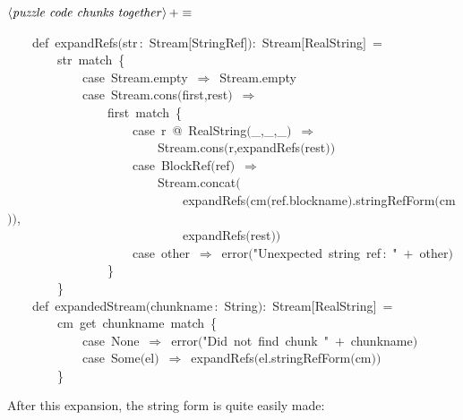 \documentclass[a4paper,12pt]{article}
\begin{document}
$\left<\mbox{\emph{puzzle code chunks together}}\right>+\equiv$
\begin{program}~~~~{\vem def}~expandRefs$($str\,{\rm :}~Stream$[$StringRef$]$$)${\rm :}~Stream$[$RealString$]$~=
\\~~~~~~~~str~{\vem match}~{\small\{}
\\~~~~~~~~~~~~{\vem case}~Stream.empty~$\Rightarrow$~Stream.empty
\\~~~~~~~~~~~~{\vem case}~Stream.cons$($first,rest$)$~$\Rightarrow$
\\~~~~~~~~~~~~~~~~first~{\vem match}~{\small\{}
\\~~~~~~~~~~~~~~~~~~~~{\vem case}~r~@~RealString$($\_,\_,\_$)$~$\Rightarrow$
\\~~~~~~~~~~~~~~~~~~~~~~~~Stream.cons$($r,expandRefs$($rest$)$$)$
\\~~~~~~~~~~~~~~~~~~~~{\vem case}~BlockRef$($ref$)$~$\Rightarrow$
\\~~~~~~~~~~~~~~~~~~~~~~~~Stream.concat$($
\\~~~~~~~~~~~~~~~~~~~~~~~~~~~~expandRefs$($cm$($ref.blockname$)$.stringRefForm$($cm$)$$)$,
\\~~~~~~~~~~~~~~~~~~~~~~~~~~~~expandRefs$($rest$)$$)$
\\~~~~~~~~~~~~~~~~~~~~{\vem case}~other~$\Rightarrow$~error$($"Unexpected~string~ref\,{\rm :}~"~$+$~other$)$
\\~~~~~~~~~~~~~~~~{\small\}}
\\~~~~~~~~{\small\}}
\\[0.5em]~~~~{\vem def}~expandedStream$($chunkname\,{\rm :}~String$)${\rm :}~Stream$[$RealString$]$~=
\\~~~~~~~~cm~get~chunkname~{\vem match}~{\small\{}
\\~~~~~~~~~~~~{\vem case}~None~$\Rightarrow$~error$($"Did~not~find~chunk~"~$+$~chunkname$)$
\\~~~~~~~~~~~~{\vem case}~Some$($el$)$~$\Rightarrow$~expandRefs$($el.stringRefForm$($cm$)$$)$
\\~~~~~~~~{\small\}}
\\[0.5em]\end{program}



After this expansion, the string form is quite easily made:
\end{document}
